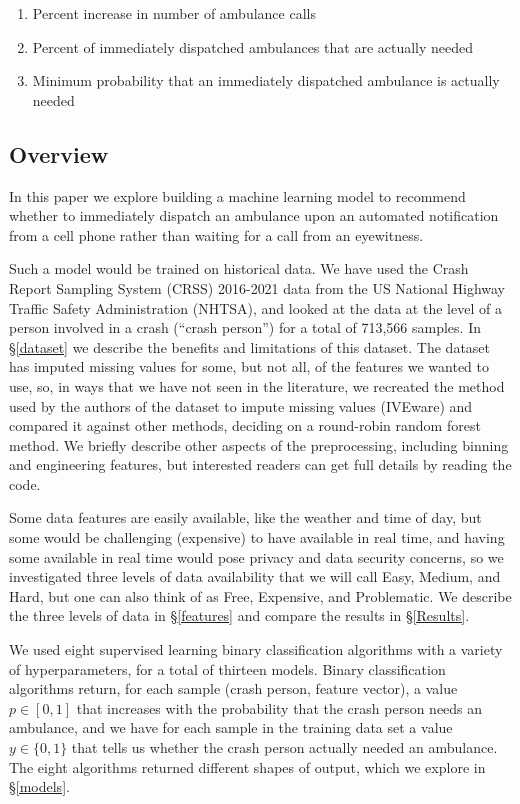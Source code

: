 \begin{enumerate}
	\item Percent increase in number of ambulance calls
	\item Percent of immediately dispatched ambulances that are actually needed
	\item Minimum probability that an immediately dispatched ambulance is actually needed
\end{enumerate}

\subsection{Overview}
\label{intro_overview}

In this paper we explore building a machine learning model to recommend whether to immediately dispatch an ambulance upon an automated notification from a cell phone rather than waiting for a call from an eyewitness.

Such a model would be trained on historical data.  We have used the Crash Report Sampling System (CRSS) 2016-2021 data from the US National Highway Traffic Safety Administration (NHTSA), and looked at the data at the level of a person involved in a crash (``crash person'') for a total of 713,566 samples.  In \S \ref{dataset} we describe the benefits and limitations of this dataset.  The dataset has imputed missing values for some, but not all, of the features we wanted to use, so, in ways that we have not seen in the literature, we recreated the method used by the authors of the dataset to impute missing values (IVEware) and compared it against other methods, deciding on a round-robin random forest method.  We briefly describe other aspects of the preprocessing, including binning and engineering features, but interested readers can get full details by reading the code.  

Some data features are easily available, like the weather and time of day, but some would be challenging (expensive) to have available in real time, and having some available in real time would pose privacy and data security concerns, so we investigated three levels of data availability that we will call Easy, Medium, and Hard, but one can also think of as Free, Expensive, and Problematic.  We describe the three levels of data in \S \ref{features} and compare the results in \S  \ref{Results}.  

We used eight supervised learning binary classification algorithms with a variety of hyperparameters, for a total of thirteen models.  Binary classification algorithms return, for each sample (crash person, feature vector), a value $p \in [0,1]$ that increases with the probability that the crash person needs an ambulance, and we have for each sample in the training data set a value $y \in \{0,1\}$ that tells us whether the crash person actually needed an ambulance.  The eight algorithms returned different shapes of output, which we explore in \S \ref{models}.

